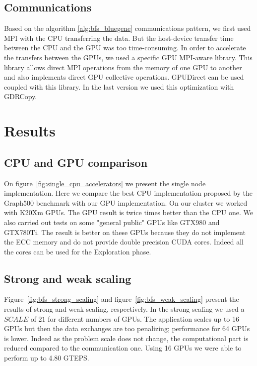  
\subsection{Communications}

Based on the algorithm \ref{alg:bfs_bluegene} communications pattern, we first used MPI with the CPU transferring the data. But the host-device transfer time between the CPU and the GPU was too time-consuming. 
In order to accelerate the transfers between the GPUs, we used a specific GPU MPI-aware  library. This library allows direct MPI operations from the memory of one GPU to another and also implements direct GPU collective operations. 
GPUDirect can be used coupled with this library. In the last version we used this optimization with GDRCopy. 

\section{Results}

\subsection{CPU and GPU comparison}

On figure~\ref{fig:single_cpu_accelerators} we present the single node implementation. 
Here we compare the best CPU implementation proposed by the Graph500 benchmark with our GPU implementation. 
On our cluster we worked with K20Xm GPUs. 
The GPU result is twice times better than the CPU one. 
We also carried out tests on some "general public" GPUs like GTX980 and GTX780Ti. 
The result is better on these GPUs because they do not implement the ECC memory and do not provide double precision CUDA cores. 
Indeed all the cores can be used for the Exploration phase. 



\subsection{Strong and weak scaling}

Figure~\ref{fig:bfs_strong_scaling} and figure~\ref{fig:bfs_weak_scaling} present the results of strong and weak scaling, respectively. 
In the strong scaling we used a $SCALE$ of $21$ for different numbers of GPUs. 
The application scales up to 16 GPUs but then the data exchanges are too penalizing;
performance for 64 GPUs is lower. 
Indeed as the problem scale does not change, the computational part is reduced compared to the communication one. 
Using 16 GPUs we were able to perform up to 4.80 GTEPS. 

